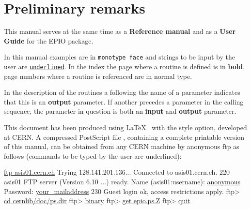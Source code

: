 \section*{Preliminary remarks}
 
This manual serves at the same time as a {\bf Reference manual}
and as a {\bf User Guide} for the EPIO package.
 
In this manual
examples are in {\tt monotype face} and strings to be input by the user 
are {\tt\underline{underlined}}.
In the index the page where a routine is defined is in {\bf bold},
page numbers where a routine is referenced are in normal type.

In the description of the routines a \Lit{*} following
the name of a parameter indicates that this is an {\bf output} parameter.
If another \Lit{*} precedes a parameter in the calling sequence, the
parameter in question is both an {\bf input} and {\bf output} parameter.

This document has been produced using \LaTeX~\cite{bib-LATEX}
with the  style option, developed at CERN. 
A compressed PostScript file , 
containing a complete printable version
of this manual, can be obtained from any CERN machine
by anonymous ftp as follows
(commands to be typed by the user are underlined):

\vspace*{3mm} 
\begin{XMP}
    \underline{ftp asis01.cern.ch}
    Trying 128.141.201.136...
    Connected to asis01.cern.ch.
    220 asis01 FTP server (Version 6.10 ...) ready.
    Name (asis01:username): \underline{anonymous}
    Password: \underline{your\_{}mailaddress}
    230 Guest login ok, access restrictions apply.
    ftp> \underline{cd cernlib/doc/ps.dir}
    ftp> \underline{binary}
    ftp> \underline{get epio.ps.Z}
    ftp> \underline{quit}
\end{XMP}

\newpage
\tableofcontents
\listoftables

